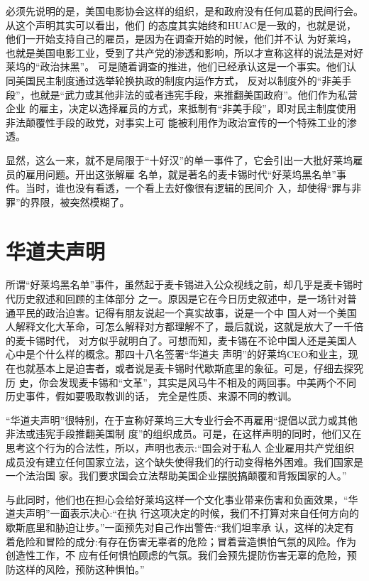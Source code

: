 \documentclass[10pt]{article}
\begin{document}
{必须先说明的是，美国电影协会这样的组织，是和政府没有任何瓜葛的民间行会。从这个声明其实可以看出，他们
的态度其实始终和HUAC是一致的，也就是说，他们一开始支持自己的雇员，是因为在调查开始的时候，他们并不认
为好莱坞，也就是美国电影工业，受到了共产党的渗透和影响，所以才宣称这样的说法是对好莱坞的``政治抹黑''。
可是随着调查的推进，他们已经承认这是一个事实。他们认同美国民主制度通过选举轮换执政的制度内运作方式，
反对以制度外的``非美手段''，也就是``武力或其他非法的或者违宪手段，来推翻美国政府''。他们作为私营企业
的雇主，决定以选择雇员的方式，来抵制有``非美手段''，即对民主制度使用非法颠覆性手段的政党，对事实上可
能被利用作为政治宣传的一个特殊工业的渗透。

显然，这么一来，就不是局限于``十好汉''的单一事件了，它会引出一大批好莱坞雇员的雇用问题。开出这张解雇
名单，就是著名的麦卡锡时代``好莱坞黑名单''事件。当时，谁也没有看透，一个看上去好像很有逻辑的民间介
入，却使得``罪与非罪''的界限，被突然模糊了。

\pagebreak
\section{华道夫声明}

所谓``好莱坞黑名单''事件，虽然起于麦卡锡进入公众视线之前，却几乎是麦卡锡时代历史叙述和回顾的主体部分
之一。原因是它在今日历史叙述中，是一场针对普通平民的政治迫害。记得有朋友说起一个真实故事，说是一个中
国人对一个美国人解释文化大革命，可怎么解释对方都理解不了，最后就说，这就是放大了一千倍的麦卡锡时代，
对方似乎就明白了。可想而知，麦卡锡在不论中国人还是美国人心中是个什么样的概念。那四十八名签署``华道夫
声明''的好莱坞CEO和业主，现在也就基本上是迫害者，或者说是麦卡锡时代歇斯底里的象征。可是，仔细去探究历
史，你会发现麦卡锡和``文革''，其实是风马牛不相及的两回事。中美两个不同历史事件，假如要吸取教训的话，
完全是性质、来源不同的教训。

``华道夫声明''很特别，在于宣称好莱坞三大专业行会不再雇用``提倡以武力或其他非法或违宪手段推翻美国制
度''的组织成员。可是，在这样声明的同时，他们又在思考这个行为的合法性，所以，声明也表示:``国会对于私人
企业雇用共产党组织成员没有建立任何国家立法，这个缺失使得我们的行动变得格外困难。我们国家是一个法治国
家。我们要求国会立法帮助美国企业摆脱搞颠覆和背叛国家的人。''

与此同时，他们也在担心会给好莱坞这样一个文化事业带来伤害和负面效果，``华道夫声明''一面表示决心:``在执
行这项决定的时候，我们不打算对来自任何方向的歇斯底里和胁迫让步。''一面预先对自己作出警告:``我们坦率承
认，这样的决定有着危险和冒险的成分:有存在伤害无辜者的危险；冒着营造惧怕气氛的风险。作为创造性工作，不
应有任何惧怕顾虑的气氛。我们会预先提防伤害无辜的危险，预防这样的风险，预防这种惧怕。''

}
\end{document}
